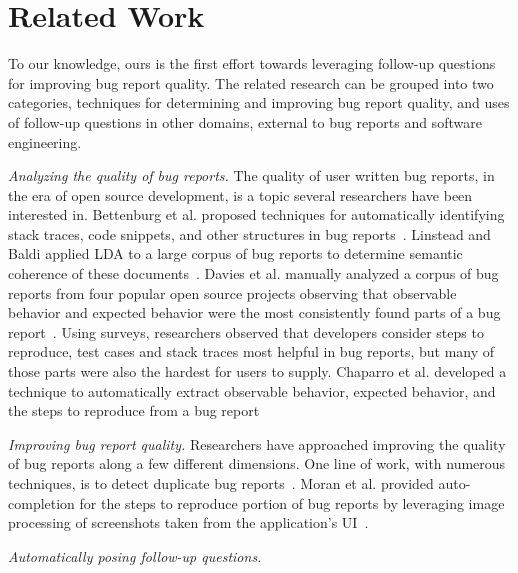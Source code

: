 \section{Related Work}
To our knowledge, ours is the first effort towards leveraging follow-up questions for
improving bug report quality. The related research can be grouped into two categories, techniques
for determining and improving bug report quality, and uses of follow-up questions in other domains,
external to bug reports and software engineering.

\noindent
{\em Analyzing the quality of bug reports.} The quality of user written bug reports,
in the era of open source development, is a topic several researchers have been interested
in. Bettenburg et al. proposed techniques for automatically identifying stack traces, code
snippets, and other structures in bug reports~\cite{bettenburg08extracting}. Linstead and Baldi
applied LDA to a large corpus of bug reports to determine semantic coherence of these
documents~\cite{linstead09mining}. Davies et al. manually analyzed a corpus of bug reports
from four popular open source projects observing
that observable behavior and expected behavior were the most consistently found parts
of a bug report~\cite{davies14whats}. Using surveys, researchers observed that developers
consider steps to reproduce, test cases and stack traces most helpful in bug reports, but
many of those parts were also the hardest for users to supply. Chaparro et al. developed a
technique to automatically extract observable behavior, expected behavior, and the steps to
reproduce from a bug report~\cite{chaparro17detecting}

\noindent
{\em Improving bug report quality.} Researchers have approached improving the quality of
bug reports along a few different dimensions. One line of work, with numerous techniques,
is to detect duplicate bug reports~\cite{chaparro19reformulating}. Moran et al. provided
auto-completion for the steps to reproduce portion of bug reports by leveraging image processing
of screenshots taken from the application's UI~\cite{moran15autocompleting}.

\noindent
{\em Automatically posing follow-up questions.}
